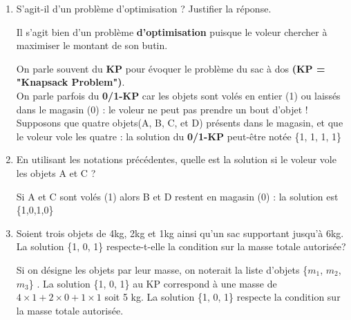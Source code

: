 \documentclass[12pt,french]{article}
\begin{document}
\begin{enumerate}
	\item S'agit-il d'un problème d'optimisation ? Justifier la réponse.
	\begin{tcolorbox}[enhanced,attach boxed title to top center={yshift=-3mm,yshifttext=-1mm},
		colback=blue!5!white,colframe=blue!75!black,colbacktitle=blue!25!black,
		title=solution :, fonttitle=\bfseries,
		boxed title style={size=small,colframe=green!25!black} ]
	Il s'agit bien d'un problème \textbf{d'optimisation} puisque le voleur chercher à maximiser le montant de son butin.
\end{tcolorbox}
	\begin{tcolorbox}[enhanced,attach boxed title to top center={yshift=-3mm,yshifttext=-1mm},
		colback=red!5!white,colframe=red!75!black,colbacktitle=red!25!black,
		title=Notations, fonttitle=\bfseries,
		boxed title style={size=small,colframe=red!25!black} ]
		On parle souvent du \textbf{KP} pour évoquer le problème du sac à dos  \textbf{(KP = "Knapsack Problem")}.\\
		On parle parfois du \textbf{0/1-KP} car les objets sont volés en entier (1) ou laissés dans le magasin (0) : le voleur ne peut pas prendre un bout d'objet ! Supposons que  quatre objets(A, B, C, et D) présents dans le magasin, et que le voleur vole les quatre : la solution du  \textbf{0/1-KP} peut-être notée \{1, 1, 1, 1\}
	\end{tcolorbox}
	\item En utilisant les notations précédentes, quelle est la solution si le voleur vole les objets A et C ?
	\begin{tcolorbox}[enhanced,attach boxed title to top center={yshift=-3mm,yshifttext=-1mm},
		colback=blue!5!white,colframe=blue!75!black,colbacktitle=blue!25!black,
		title=solution :, fonttitle=\bfseries,
		boxed title style={size=small,colframe=green!25!black} ]
	Si A et C sont volés (1) alors B et D restent en magasin (0) : la solution est \{1,0,1,0\}
\end{tcolorbox}
	\item Soient trois objets de 4kg, 2kg et 1kg ainsi qu'un sac supportant jusqu'à 6kg. La solution \{1, 0, 1\} respecte-t-elle la condition sur la masse totale autorisée?
	\begin{tcolorbox}[enhanced,attach boxed title to top center={yshift=-3mm,yshifttext=-1mm},
		colback=blue!5!white,colframe=blue!75!black,colbacktitle=blue!25!black,
		title=solution :, fonttitle=\bfseries,
		boxed title style={size=small,colframe=green!25!black} ]
	Si on désigne les objets par leur masse, on noterait la liste d'objets \{$m_1$, $m_2$, $m_3$\} . La solution \{1, 0, 1\} au KP correspond à une masse de $4 \times 1 + 2 \times 0 + 1 \times1$ soit 5 kg. La solution \{1, 0, 1\} respecte la condition sur la masse totale autorisée.
\end{tcolorbox}
\end{enumerate} 
\end{document}
